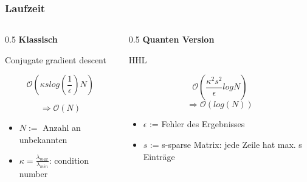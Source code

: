 \begin{frame}
    \frametitle{Laufzeit}
    \begin{columns}[c]
        \begin{column}{0.5\hsize}
            \textbf{Klassisch}

            \hfil

            Conjugate gradient descent 

            $$ \mathcal{O}(\kappa s log{\left(\frac 1 \epsilon\right)} N ) $$

            $$ \Rightarrow \mathcal{O} (N) $$

            \hfil

            \begin{itemize}
            \item $N :=$ Anzahl an unbekannten 
            \item $\kappa= \frac {\lambda_{max}} {\lambda_{min}}$:  condition number
            \end{itemize}

        \end{column}
        

        \begin{column}{0.5\hsize}
            \textbf{Quanten Version}

            \hfil

            HHL

            $$ \mathcal{O}(\frac{\kappa^2s^2}{\epsilon}logN) $$
            $$ \Rightarrow \mathcal{O} (log(N)) $$
            \hfil

            \begin{itemize}
            \item $\epsilon$ := Fehler des Ergebnisses
            \item $s$ := s-sparse Matrix: jede Zeile hat max. s Einträge
            \end{itemize}

        \end{column}
    \end{columns}
 
    \hfil



\end{frame}


